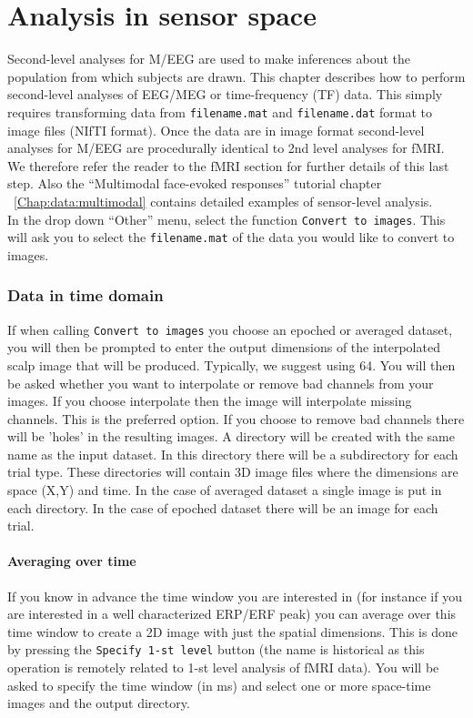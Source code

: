 \chapter{Analysis in sensor space \label{Chap:eeg:sensoranalysis}}

Second-level analyses for M/EEG are used to make inferences about the population from which subjects are drawn. This chapter describes how to perform second-level analyses of EEG/MEG or time-frequency (TF) data. This simply requires transforming data from \texttt{filename.mat} and \texttt{filename.dat}
format to image files (NIfTI format). Once the data are in image format second-level analyses for M/EEG are procedurally identical to 2nd level analyses for fMRI.
We therefore refer the reader to the fMRI section for further details of this last step. Also the ``Multimodal face-evoked responses'' tutorial chapter ~\ref{Chap:data:multimodal} contains detailed examples of sensor-level analysis. 
\\
In the drop down ``Other'' menu, select the function \texttt{Convert to images}. This will ask you to select the \texttt{filename.mat} of the data you would like to convert to images.
\\
\subsection{Data in time domain}
If when calling \texttt{Convert to images} you choose an epoched or averaged dataset, you will then be prompted to enter the output dimensions of the interpolated scalp image that will be produced. Typically, we suggest using 64. You will then be asked whether you want to interpolate or remove bad channels from your images. If you choose interpolate then the image will interpolate missing channels. This is the preferred option. If you choose to remove bad channels there will be 'holes' in the resulting images. A directory will be created with the same name as the input dataset. In this directory there will be a subdirectory for each trial type. These directories will contain 3D image files where the dimensions are space (X,Y) and time. In the case of averaged dataset a single image is put in each directory. In the case of epoched dataset there will be an image for each trial. 
\\
\subsubsection{Averaging over time}
If you know in advance the time window you are interested in (for instance if you are interested in a well characterized ERP/ERF peak) you can average over this time window to create a 2D image with just the spatial dimensions. This is done by pressing the \texttt{Specify 1-st level} button (the name is historical as this operation is remotely related to 1-st level analysis of fMRI data). You will be asked to specify the time window (in ms) and select one or more space-time images and the output directory. 
\\
